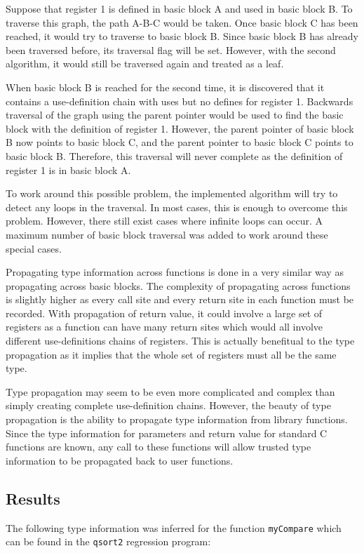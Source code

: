 Suppose that register 1 is defined in basic block A and used in basic block 
B. To traverse this graph, the path A-B-C would be taken. Once basic
block C has been reached, it would try to traverse to basic block B. Since
basic block B has already been traversed before, its traversal flag will 
be set. However, with the second algorithm, it would still be traversed
again and treated as a leaf. 

When basic block B is reached for the second time, it is discovered that
it contains a use-definition chain with uses but no defines for register 1.
Backwards traversal of the graph using the parent pointer would be used to
find the basic block with the definition of register 1. However, the parent
pointer of basic block B now points to basic block C, and the parent pointer
to basic block C points to basic block B. Therefore, this traversal will never
complete as the definition of register 1 is in basic block A.

To work around this possible problem, the implemented algorithm will try to 
detect any loops in the traversal. In most cases, this is enough to overcome 
this problem. However, there still exist cases where infinite loops can occur. 
A maximum number of basic block traversal was added to work around these 
special cases.

Propagating type information across functions is done in a very similar way as
propagating across basic blocks. The complexity of propagating across functions
is slightly higher as every call site and every return site in each function
must be recorded. With propagation of return value, it could involve a large set
of registers as a function can have many return sites which would all involve
different use-definitions chains of registers. This is actually benefitual to
the type propagation as it implies that the whole set of registers must all 
be the same type.

Type propagation may seem to be even more complicated and complex than simply
creating complete use-definition chains. However, the beauty of type 
propagation is the ability to propagate type information from library 
functions. Since the type information for parameters and return value for 
standard C functions are known, any call to these functions will allow 
trusted type information to be propagated back to user functions.


\subsection{Results}
The following type information was inferred for the function \texttt{myCompare}
which can be found in the \texttt{qsort2} regression program:

